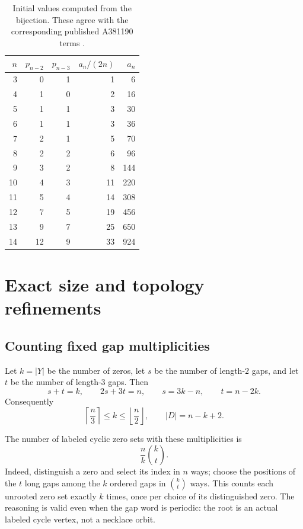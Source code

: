 \documentclass[11pt,letterpaper]{article}
\numberwithin{equation}{section}
\theoremstyle{definition}
\newcommand{\1}{\mathbf 1}
\begin{document}
\begin{table}[ht]
\centering
\begin{tabular}{rrrrr}
\toprule
$n$ & $p_{n-2}$ & $p_{n-3}$ & $a_n/(2n)$ & $a_n$\\
\midrule
3&0&1&1&6\\
4&1&0&2&16\\
5&1&1&3&30\\
6&1&1&3&36\\
7&2&1&5&70\\
8&2&2&6&96\\
9&3&2&8&144\\
10&4&3&11&220\\
11&5&4&14&308\\
12&7&5&19&456\\
13&9&7&25&650\\
14&12&9&33&924\\
\bottomrule
\end{tabular}
\caption{Initial values computed from the bijection. These agree with the
corresponding published A381190 terms \cite{A381190}.}
\end{table}

\section{Exact size and topology refinements}\label{sec:refined}

\subsection{Counting fixed gap multiplicities}
Let $k=|Y|$ be the number of zeros, let $s$ be the number of length-$2$ gaps,
and let $t$ be the number of length-$3$ gaps. Then
\begin{equation}\label{eq:st}
 s+t=k,\qquad 2s+3t=n,\qquad s=3k-n,\qquad t=n-2k.
\end{equation}
Consequently
\begin{equation}\label{eq:krange}
 \left\lceil\frac n3\right\rceil\le k\le
 \left\lfloor\frac n2\right\rfloor,
 \qquad |D|=n-k+2.
\end{equation}

The number of labeled cyclic zero sets with these multiplicities is
\begin{equation}\label{eq:cycliccount}
 \frac nk\binom{k}{t}.
\end{equation}
Indeed, distinguish a zero and select its index in $n$ ways; choose the
positions of the $t$ long gaps among the $k$ ordered gaps in $\binom{k}{t}$
ways. This counts each unrooted zero set exactly $k$ times, once per choice
of its distinguished zero. The reasoning is valid even when the gap word is
periodic: the root is an actual labeled cycle vertex, not a necklace orbit.
\end{document}
